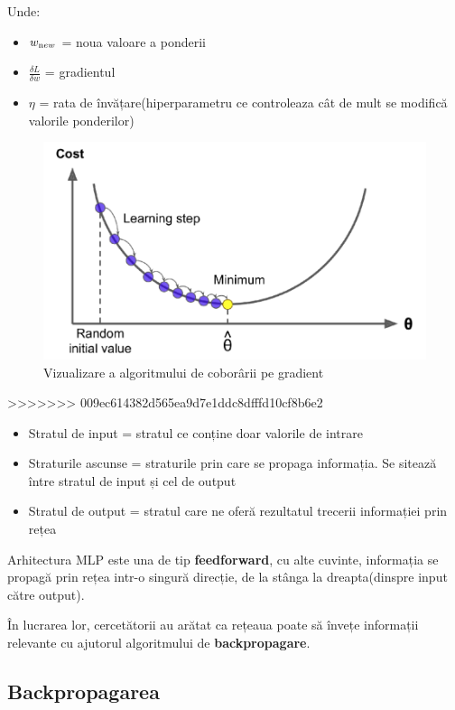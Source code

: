 Unde: 

\begin{itemize}
    \item $w_{\text new}$ = noua valoare a ponderii
    \item $\frac{\delta L}{\delta w}$ = gradientul 
    \item $\eta$ = rata de învățare(hiperparametru ce controleaza cât de mult se modifică valorile ponderilor)
\end{itemize}

\begin{figure}[h]
         \centering 
         \includegraphics[width=.75\linewidth]{images/gradient-descent.png}
         \captionsetup{font=footnotesize}
         \caption{Vizualizare a algoritmului de coborârii pe gradient \cite{GD}}
\end{figure}
>>>>>>> 009ec614382d565ea9d7e1ddc8dfffd10cf8b6e2

\begin{itemize}
    \item Stratul de input = stratul ce conține doar valorile de intrare
    \item Straturile ascunse = straturile prin care se propaga informația. Se sitează între stratul de input și cel de output
    \item Stratul de output = stratul care ne oferă rezultatul trecerii informației prin rețea
\end{itemize}

Arhitectura MLP este una de tip \textbf{feedforward}, cu alte cuvinte, informația se propagă prin rețea intr-o singură direcție, de la stânga la dreapta(dinspre input către output).

În lucrarea lor, cercetătorii au arătat ca rețeaua poate să învețe informații relevante cu ajutorul algoritmului de \textbf{backpropagare}. 
\subsection{Backpropagarea}

